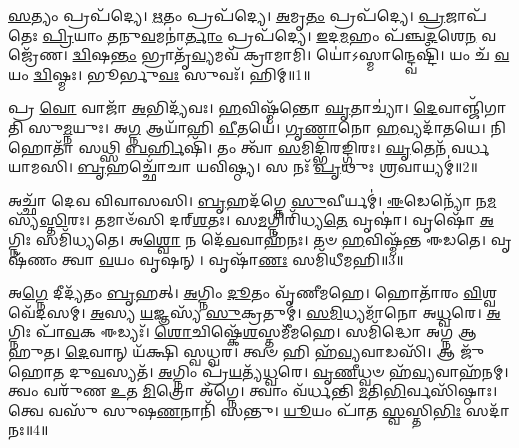\clearpage
{}
\setcounter{anuvakam}{0}

\-\ul{𑌸}\-𑌤𑍍𑌯𑌂 𑌪𑍍𑌰𑌪᳴𑌦𑍍𑌯𑍇।
\-\ul{𑌋}\-𑌤𑌂 𑌪𑍍𑌰𑌪᳴𑌦𑍍𑌯𑍇।
\-\ul{𑌅}\-𑌮𑍃\-\ul{𑌤𑌂} 𑌪𑍍𑌰𑌪᳴𑌦𑍍𑌯𑍇।
\-\ul{𑌪𑍍𑌰}\-𑌜𑌾𑌪᳴𑌤𑍇𑌃 \ul{𑌪𑍍𑌰𑌿}\-𑌯𑌾𑌂 \ul{𑌤}\-𑌨𑍁\-\ul{𑌵}\-𑌮𑌨𑌾॑\-\ul{𑌰𑍍𑌤𑌾𑌂} 𑌪𑍍𑌰𑌪᳴𑌦𑍍𑌯𑍇।
\-\ul{𑌇}\-𑌦\-\ul{𑌮}\-𑌹𑌂 𑌪᳴𑌞𑍍𑌚\-\ul{𑌦}\-𑌶𑍇\-\ul{𑌨} 𑌵𑌜𑍍𑌰𑍇᳴𑌣।
\-\ul{𑌦𑍍𑌵𑌿}\-𑌷\-\ul{𑌨𑍍𑌤𑌂} 𑌭𑍍𑌰𑌾𑌤𑍃᳴\-\ul{𑌵𑍍𑌯}\-𑌮𑌵᳴ 𑌕𑍍𑌰𑌾𑌮𑌾𑌮𑌿।
𑌯𑍋॑𑌽𑌸𑍍𑌮𑌾𑌨𑍍𑌦𑍍𑌵𑍇𑌷𑍍𑌟𑌿᳴।
𑌯𑌂 𑌚᳴ \ul{𑌵}\-𑌯𑌂 \ul{𑌦𑍍𑌵𑌿}\-𑌷𑍍𑌮𑌃।
𑌭𑍂𑌰𑍍𑌭𑍁\-\ul{𑌵𑌃} 𑌸𑍁𑌵𑌃᳴।
𑌹𑌿𑌮𑍍॥1॥\anuvakamend[\-\ul{𑌸}\-𑌤𑍍𑌯𑌂 𑌦𑌶᳴]

𑌪𑍍𑌰 \ul{𑌵𑍋} 𑌵𑌾𑌜𑌾᳴ \ul{𑌅}\-𑌭𑌿𑌦𑍍𑌯᳴𑌵𑌃।
\-\ul{𑌹}\-𑌵𑌿𑌷𑍍𑌮᳴𑌨𑍍𑌤𑍋 \ul{𑌘𑍃}\-𑌤𑌾𑌚𑍍𑌯𑌾॑।
\-\ul{𑌦𑍇}\-𑌵𑌾𑌞𑍍𑌜𑌿᳴𑌗𑌾𑌤𑌿 𑌸𑍁\-\ul{𑌮𑍍𑌨}\-𑌯𑍁𑌃।
𑌅\-\ul{𑌗𑍍𑌨} 𑌆𑌯𑌾᳴𑌹𑌿 \ul{𑌵𑍀}\-𑌤𑌯𑍇॑।
\-\ul{𑌗𑍃}\-\-\ul{𑌣𑌾}\-𑌨𑍋 \ul{𑌹}\-𑌵𑍍𑌯𑌦𑌾᳴𑌤𑌯𑍇।
𑌨𑌿 𑌹𑍋𑌤𑌾᳴ 𑌸𑌥𑍍𑌸𑌿 \ul{𑌬}\-\-\ul{𑌰𑍍}\-𑌹𑌿𑌷𑌿᳴।
𑌤𑌂 𑌤𑍍𑌵𑌾᳴ \ul{𑌸}\-𑌮𑌿𑌦𑍍𑌭𑌿᳴𑌰𑌙𑍍𑌗𑌿𑌰𑌃।
\-\ul{𑌘𑍃}\-𑌤𑍇𑌨᳴ 𑌵𑌰𑍍𑌧𑌯𑌾𑌮𑌸𑌿।
\-\ul{𑌬𑍃}\-𑌹𑌚𑍍𑌛𑍋᳴𑌚𑌾 𑌯𑌵𑌿𑌷𑍍𑌠𑍍𑌯।
𑌸 𑌨𑌃᳴ \ul{𑌪𑍃}\-𑌥𑍁𑌃 \ul{𑌶𑍍𑌰}\-𑌵𑌾𑌯𑍍𑌯𑌮𑍍॑॥2॥

𑌅𑌚𑍍𑌛𑌾᳴ 𑌦𑍇𑌵 𑌵𑌿𑌵𑌾𑌸𑌸𑌿।
\-\ul{𑌬𑍃}\-𑌹𑌦᳴𑌗𑍍𑌨𑍇 \ul{𑌸𑍁}\-𑌵𑍀𑌰𑍍𑌯𑌮𑍍॑।
\-\ul{𑌈}\-𑌡𑍇𑌨𑍍𑌯𑍋᳴ 𑌨\-\ul{𑌮}\-𑌸𑍍𑌯᳴\-\ul{𑌸𑍍𑌤𑌿}\-𑌰𑌃।
𑌤𑌮𑌾𑍞᳴𑌸𑌿 𑌦𑌰𑍍‌\mbox{}\-\ul{𑌶}\-𑌤𑌃।
𑌸\-\ul{𑌮}\-𑌗𑍍𑌨𑌿𑌰𑌿᳴𑌧𑍍𑌯\-\ul{𑌤𑍇} 𑌵𑍃𑌷𑌾॑।
𑌵𑍃𑌷𑍋᳴ \ul{𑌅}\-𑌗𑍍𑌨𑌿𑌃 𑌸𑌮𑌿᳴𑌧𑍍𑌯𑌤𑍇।
𑌅\-\ul{𑌶𑍍𑌵𑍋} 𑌨 𑌦𑍇᳴\-\ul{𑌵}\-𑌵𑌾𑌹᳴𑌨𑌃।
𑌤𑍞 \ul{𑌹}\-𑌵𑌿𑌷𑍍𑌮᳴𑌨𑍍𑌤 𑌈𑌡𑌤𑍇।
𑌵𑍃𑌷᳴𑌣𑌂 𑌤𑍍𑌵𑌾 \ul{𑌵}\-𑌯𑌂 𑌵𑍃𑌷𑌨𑍍।
𑌵𑍃𑌷𑌾᳴\-\ul{𑌣𑌃} 𑌸𑌮𑌿᳴𑌧𑍀𑌮𑌹𑌿॥3॥

𑌅\-\ul{𑌗𑍍𑌨𑍇} 𑌦𑍀𑌦𑍍𑌯᳴𑌤𑌂 \ul{𑌬𑍃}\-𑌹𑌤𑍍।
\-\ul{𑌅}\-𑌗𑍍𑌨𑌿𑌂 \ul{𑌦𑍂}\-𑌤𑌂 𑌵𑍃᳴𑌣𑍀𑌮𑌹𑍇।
𑌹𑍋𑌤𑌾᳴𑌰𑌂 \ul{𑌵𑌿}\-𑌶𑍍𑌵𑌵𑍇᳴𑌦𑌸𑌮𑍍।
\-\ul{𑌅}\-𑌸𑍍𑌯 \ul{𑌯}\-𑌜𑍍𑌞𑌸𑍍𑌯᳴ \ul{𑌸𑍁}\-𑌕𑍍𑌰𑌤𑍁𑌮𑍍॑।
\-\ul{𑌸}\-\-\ul{𑌮𑌿}\-𑌧𑍍𑌯𑌮𑌾᳴𑌨𑍋 𑌅\-\ul{𑌧𑍍𑌵}\-𑌰𑍇।
\-\ul{𑌅}\-𑌗𑍍𑌨𑌿𑌃 𑌪𑌾᳴\-\ul{𑌵}\-𑌕 𑌈𑌡𑍍𑌯𑌃᳴।
\-\ul{𑌶𑍋}\-𑌚𑌿𑌷𑍍𑌕𑍇᳴\-\ul{𑌶}\-𑌸𑍍𑌤𑌮𑍀᳴𑌮𑌹𑍇।
𑌸𑌮𑌿᳴𑌦𑍍𑌧𑍋 𑌅𑌗𑍍𑌨 𑌆𑌹𑍁𑌤।
\-\ul{𑌦𑍇}\-𑌵𑌾𑌨𑍍 𑌯᳴𑌕𑍍𑌷𑌿 𑌸𑍍𑌵𑌧𑍍𑌵𑌰।
𑌤𑍍𑌵𑍞 𑌹𑌿 𑌹᳴\-\ul{𑌵𑍍𑌯}\-𑌵𑌾𑌡𑌸𑌿᳴।
𑌆 𑌜𑍁᳴𑌹𑍋𑌤 𑌦𑍁\-\ul{𑌵}\-𑌸𑍍𑌯𑌤᳴।
\-\ul{𑌅}\-𑌗𑍍𑌨𑌿𑌂 𑌪𑍍𑌰᳴\-\ul{𑌯}\-𑌤𑍍𑌯᳴\-\ul{𑌧𑍍𑌵}\-𑌰𑍇।
\-\ul{𑌵𑍃}\-\-\ul{𑌣𑍀}\-𑌧𑍍𑌵𑍞 𑌹᳴\-\ul{𑌵𑍍𑌯}\-𑌵𑌾𑌹᳴𑌨𑌮𑍍।
𑌤𑍍𑌵𑌂 𑌵𑌰𑍁᳴𑌣 \ul{𑌉}\-𑌤 \ul{𑌮𑌿}\-𑌤𑍍𑌰𑍋 𑌅᳴𑌗𑍍𑌨𑍇।
𑌤𑍍𑌵𑌾𑌂 𑌵᳴𑌰𑍍𑌧𑌨𑍍𑌤𑌿 \ul{𑌮}\-𑌤𑌿\-\ul{𑌭𑌿}\-𑌰𑍍𑌵𑌸𑌿᳴𑌷𑍍𑌠𑌾𑌃।
𑌤𑍍𑌵𑍇 𑌵𑌸𑍁᳴ 𑌸𑍁𑌷\-\ul{𑌣}\-𑌨𑌾𑌨𑌿᳴ 𑌸𑌨𑍍𑌤𑍁।
\-\ul{𑌯𑍂}\-𑌯𑌂 𑌪𑌾᳴𑌤 \ul{𑌸𑍍𑌵}\-𑌸𑍍𑌤𑌿\-\ul{𑌭𑌿𑌃} 𑌸𑌦𑌾᳴ 𑌨𑌃॥4॥\anuvakamend[\-\ul{𑌶𑍍𑌰}\-𑌵𑌾𑌯𑍍𑌯᳴𑌮𑌿𑌧𑍀\-\ul{𑌮}\-𑌹𑍍𑌯𑌸𑌿᳴ \ul{𑌸}\-𑌪𑍍𑌤 𑌚᳴]

